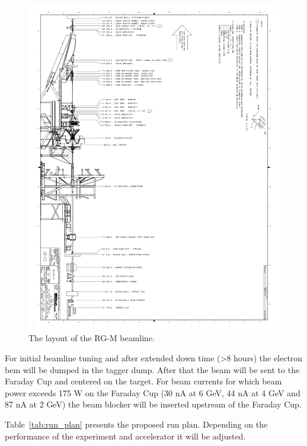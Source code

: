 \documentclass[12pt]{article}
\begin{document}
\begin{figure}[hbt]
\begin{center}
\includegraphics[width=6in]{rgm_beamline.pdf}
\end{center}
\caption{ \label{fig:beamline} \baselineskip 13pt 
The layout of the RG-M beamline. }
\end{figure}

For initial beamline tuning and after extended down time (>8 hours) the electron bem will be dumped in the tagger dump. After that the beam will be sent to the Faraday Cup and centered on the target.  For beam currents for which beam power exceeds 175 W on the Faraday Cup (30 nA at 6 GeV, 44 nA at 4 GeV and 87 nA at 2 GeV) the beam blocker will be inserted upstream of the Faraday Cup.

Table~\ref{tab:run_plan} presents the proposed run plan. Depending on the performance of the experiment and accelerator it will be adjusted.
\end{document}
